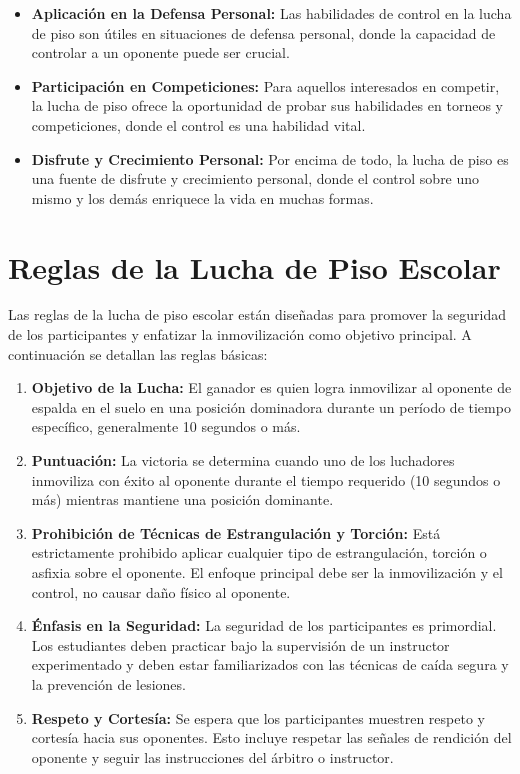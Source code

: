 \begin{itemize}
	\item \textbf{Aplicación en la Defensa Personal:} Las habilidades de control en la lucha de piso son útiles en situaciones de defensa personal, donde la capacidad de controlar a un oponente puede ser crucial.

	\item \textbf{Participación en Competiciones:} Para aquellos interesados en competir, la lucha de piso ofrece la oportunidad de probar sus habilidades en torneos y competiciones, donde el control es una habilidad vital.

	\item \textbf{Disfrute y Crecimiento Personal:} Por encima de todo, la lucha de piso es una fuente de disfrute y crecimiento personal, donde el control sobre uno mismo y los demás enriquece la vida en muchas formas.
\end{itemize}


\section{Reglas de la Lucha de Piso Escolar}

Las reglas de la lucha de piso escolar están diseñadas para promover la seguridad de los participantes y enfatizar la inmovilización como objetivo principal. A continuación se detallan las reglas básicas:

\begin{enumerate}
	\item \textbf{Objetivo de la Lucha:} El ganador es quien logra inmovilizar al oponente de espalda en el suelo en una posición dominadora durante un período de tiempo específico, generalmente 10 segundos o más.

	\item \textbf{Puntuación:} La victoria se determina cuando uno de los luchadores inmoviliza con éxito al oponente durante el tiempo requerido (10 segundos o más) mientras mantiene una posición dominante.

	\item \textbf{Prohibición de Técnicas de Estrangulación y Torción:} Está estrictamente prohibido aplicar cualquier tipo de estrangulación, torción o asfixia sobre el oponente. El enfoque principal debe ser la inmovilización y el control, no causar daño físico al oponente.

	\item \textbf{Énfasis en la Seguridad:} La seguridad de los participantes es primordial. Los estudiantes deben practicar bajo la supervisión de un instructor experimentado y deben estar familiarizados con las técnicas de caída segura y la prevención de lesiones.

	\item \textbf{Respeto y Cortesía:} Se espera que los participantes muestren respeto y cortesía hacia sus oponentes. Esto incluye respetar las señales de rendición del oponente y seguir las instrucciones del árbitro o instructor.

\end{enumerate}


